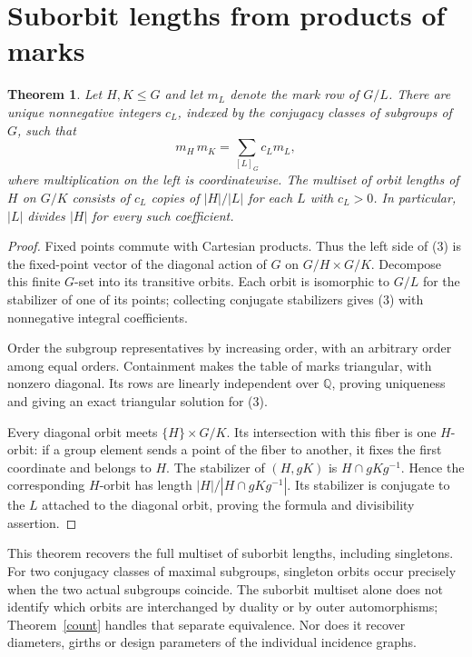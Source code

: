 \documentclass[11pt]{article}
\newtheorem{theorem}{Theorem}
\begin{document}
\section{Suborbit lengths from products of marks}
\begin{theorem}\label{product}
Let $H,K\leq G$ and let $m_L$ denote the mark row of $G/L$.
There are unique nonnegative integers $c_L$, indexed by the conjugacy
classes of subgroups of $G$, such that
\[
              m_H\,m_K=\sum_{[L]_G}c_Lm_L,                 \tag{3}
\]
where multiplication on the left is coordinatewise. The multiset of
orbit lengths of $H$ on $G/K$ consists of $c_L$ copies of $|H|/|L|$
for each $L$ with $c_L>0$. In particular, $|L|$ divides $|H|$ for
every such coefficient.
\end{theorem}
\begin{proof}
Fixed points commute with Cartesian products. Thus the left side of
(3) is the fixed-point vector of the diagonal action of $G$ on
$G/H\times G/K$. Decompose this finite $G$-set into its transitive
orbits. Each orbit is isomorphic to $G/L$ for the stabilizer of one
of its points; collecting conjugate stabilizers gives (3) with
nonnegative integral coefficients.

Order the subgroup representatives by increasing order, with an
arbitrary order among equal orders. Containment makes the table of
marks triangular, with nonzero diagonal. Its rows are linearly
independent over $\mathbb Q$, proving uniqueness and giving an exact
triangular solution for (3).

Every diagonal orbit meets $\{H\}\times G/K$. Its intersection
with this fiber is one $H$-orbit: if a group element sends a point of
the fiber to another, it fixes the first coordinate and belongs to
$H$. The stabilizer of $(H,gK)$ is $H\cap gKg^{-1}$. Hence the
corresponding $H$-orbit has length $|H|/|H\cap gKg^{-1}|$.
Its stabilizer is conjugate to the $L$ attached to the diagonal
orbit, proving the formula and divisibility assertion.
\end{proof}
This theorem recovers the full multiset of suborbit lengths, including
singletons. For two conjugacy classes of maximal subgroups, singleton
orbits occur precisely when the two actual subgroups coincide. The
suborbit multiset alone does not identify which orbits are interchanged
by duality or by outer automorphisms; Theorem~\ref{count} handles that
separate equivalence. Nor does it recover diameters, girths or design
parameters of the individual incidence graphs.
\end{document}
